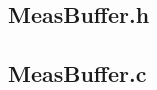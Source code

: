 \documentclass[fleqn]{article}
\begin{document}
\begin{minipage}[t]{.49\textwidth}
	
\end{minipage}\hfill
\noindent\begin{minipage}[t]{.49\textwidth}
	\subsection{MeasBuffer.h}
	
	\subsection{MeasBuffer.c}
	
\end{minipage}\hfill
\end{document}
